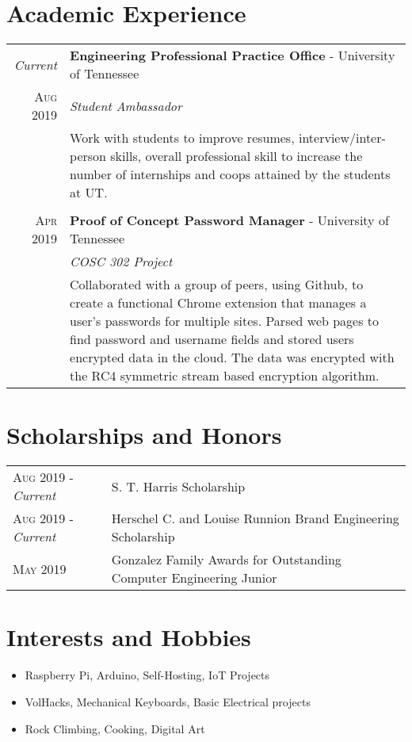 \documentclass[a4paper,11pt]{article}
\begin{document}
\section{Academic Experience}
\begin{tabularx}{\textwidth}{r|X}

   \emph{Current} & \textbf{Engineering Professional Practice Office} \-- University of Tennessee\\
   \textsc{Aug 2019} & \emph{Student Ambassador}\\
   & \small{Work with students to improve resumes, interview/inter-person skills, overall professional skill to increase the number of internships and coops attained by the students at UT\@.
   }\\

   \multicolumn{2}{c}{} \\

   \textsc{Apr 2019} & \textbf{Proof of Concept Password Manager} \-- University of Tennessee\\
   & \emph{COSC 302 Project}\\
   & \small{Collaborated with a group of peers, using Github, to create a functional Chrome extension that manages a user's passwords for multiple sites.
            Parsed web pages to find password and username fields and stored users encrypted data in the cloud.
            The data was encrypted with the RC4 symmetric stream based encryption algorithm.
   }\\
\end{tabularx}

\section{Scholarships and Honors}
\begin{tabularx}{\textwidth}{lX}
   \textsc{Aug 2019} \-- \emph{Current} & S. T. Harris Scholarship\\
   \textsc{Aug 2019} \-- \emph{Current} & Herschel C. and Louise Runnion Brand Engineering Scholarship\\
   \textsc{May 2019} & Gonzalez Family Awards for Outstanding Computer Engineering Junior\\
\end{tabularx}

\section{Interests and Hobbies}
\begin{itemize}[topsep=1pt,itemsep=0pt,partopsep=1pt, parsep=1pt]
   \item Raspberry Pi, Arduino, Self-Hosting, IoT Projects
   \item VolHacks, Mechanical Keyboards, Basic Electrical projects
   \item Rock Climbing, Cooking, Digital Art %
\end{itemize}
\end{document}
